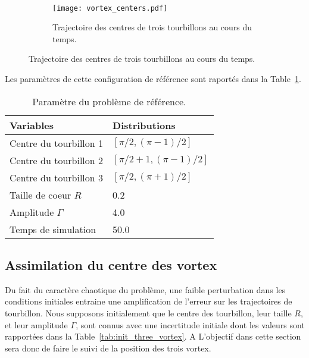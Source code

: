 \begin{figure}~\label{sec:ref_three_vortex}
    \centering
    \begin{subfigure}{0.5\textwidth}
        \texttt{[image: vortex\_centers.pdf]}
        \caption{Trajectoire des centres de trois tourbillons au cours du temps.}
    \end{subfigure}
\end{figure}

Les paramètres de cette configuration de référence sont raportés dans la Table~\ref{tab:ref_three_vortex}.

\begin{table}[htbp]
    \centering
    \caption{Paramètre du problème de référence.}
    \begin{tabular}[t]{|l|l|}
        \hline
        Variables              & Distributions                 \\
        \hline
        Centre du tourbillon 1 & $[\pi / 2, (\pi - 1) /2]$     \\
        Centre du tourbillon 2 & $[\pi / 2 + 1, (\pi - 1)/ 2]$ \\
        Centre du tourbillon 3 & $[\pi / 2, (\pi + 1) / 2]$    \\
        Taille de coeur $R$    & 0.2                           \\
        Amplitude $\Gamma$     & 4.0                           \\
        Temps de simulation    & 50.0                          \\
        \hline
    \end{tabular}
    \label{tab:ref_three_vortex}
\end{table}

\subsection{Assimilation du centre des vortex}

Du fait du caractère chaotique du problème, une faible perturbation dans les conditions initiales entraine une amplification de l'erreur sur les trajectoires de tourbillon. Nous supposons initialement que le centre des tourbillon, leur taille $R$, et leur amplitude $\Gamma$, sont connus avec une incertitude initiale dont les valeurs sont rapportées dans la Table~\ref{tab:init_three_vortex}. A
L'objectif dans cette section sera donc de faire le suivi de la position des trois vortex.

